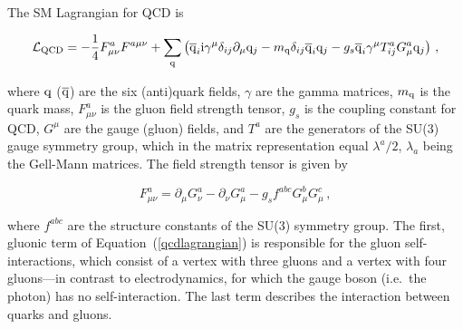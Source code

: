 The SM Lagrangian for QCD is~\cite{dissertori}
% 
\begin{linenomath*}
\begin{equation}
\label{qcdlagrangian}
\mathcal{L}_\text{QCD} =
- \frac{1}{4} F^a_{\mu\nu} F^{a\mu\nu} 
+ \sum_\mathrm{q} \left( 
    \overline{\mathrm{q}}_i \mathrm{i} \gamma^\mu \delta_{ij} \partial_\mu \mathrm{q}_j
    - m_\mathrm{q} \delta_{ij} \overline{\mathrm{q}}_i \mathrm{q}_j
    - g_s \overline{\mathrm{q}}_i \gamma^\mu T_{ij}^a G_\mu^a \mathrm{q}_j
    \right)
\,,
\end{equation}
\end{linenomath*}
% 
where $\mathrm{q}$ ($\overline{\mathrm{q}}$) are the six (anti)quark fields, $\gamma$ are the gamma matrices, $m_\mathrm{q}$ is the quark mass, $F^a_{\mu\nu}$ is the gluon field strength tensor, $g_s$ is the coupling constant for QCD, $G^\mu$ are the gauge (gluon) fields, and $T^a$ are the generators of the SU(3) gauge symmetry group, which in the matrix representation equal $\lambda^a/2$, $\lambda_a$ being the Gell-Mann matrices.
% 
The field strength tensor is given by
% 
\begin{linenomath*}
\begin{equation}
F^a_{\mu\nu}
    = \partial_\mu G^a_\nu - \partial_\nu G^a_\mu - g_s f^{abc} G_\mu^b G_\mu^c
\,,
\end{equation}
\end{linenomath*}
% 
where $f^{abc}$ are the structure constants of the SU(3) symmetry group.
% 
The first, gluonic term of Equation~(\ref{qcdlagrangian}) is responsible for the gluon self-interactions, which consist of a vertex with three gluons and a vertex with four gluons---in contrast to electrodynamics, for which the gauge boson (i.e.\ the photon) has no self-interaction.
% 
The last term describes the interaction between quarks and gluons.


